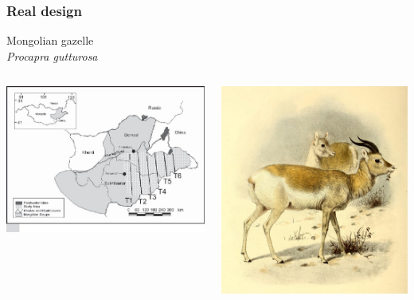 \documentclass[color=usenames,dvipsnames]{beamer}\usepackage[]{graphicx}\usepackage[]{color}
\begin{document}
\begin{frame}
  \frametitle{Real design}
  \centering
  Mongolian gazelle \\
  {\it Procapra gutturosa} \\
  \begin{columns}
    \begin{column}{0.6\textwidth}
      \includegraphics[width=\textwidth]{figs/Kirk}
    \end{column}
    \begin{column}{0.4\textwidth}
      \includegraphics[width=\textwidth]{figs/Book_of_antelopes_(1894)_Gazella_gutturosa}
    \end{column}
  \end{columns}
\end{frame}
\end{document}
